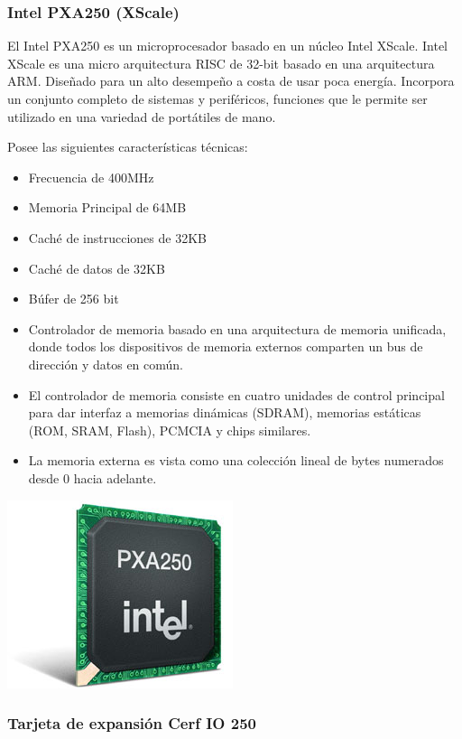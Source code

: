 \subsubsection{Intel PXA250 (XScale)}

	El Intel PXA250 es un microprocesador basado en un n\'ucleo Intel XScale.
Intel XScale es una micro arquitectura RISC de 32-bit basado en una arquitectura ARM. Dise\~nado para un alto desempe\~no a costa de usar poca energ\'ia. Incorpora un conjunto completo de sistemas y perif\'ericos, funciones que le permite ser utilizado en una variedad de port\'atiles de mano.

	Posee las siguientes caracter\'isticas t\'ecnicas:

\begin{itemize}
	\item Frecuencia de 400MHz
	\item Memoria Principal de 64MB
	\item Cach\'e de instrucciones de 32KB
	\item Cach\'e de datos de 32KB
	\item B\'ufer de 256 bit
	\item Controlador de memoria basado en una arquitectura de memoria unificada, donde todos los dispositivos de memoria externos comparten un bus de direcci\'on y datos en com\'un.
	\item El controlador de memoria consiste en cuatro unidades de control principal para dar interfaz a memorias din\'amicas (SDRAM), memorias est\'aticas (ROM, SRAM, Flash), PCMCIA y chips similares.
	\item La memoria externa es vista como una colecci\'on lineal de bytes numerados desde 0 hacia adelante.
\end{itemize}

\begin{center}
\includegraphics[scale=0.5]{images/pxa250}
\end{center}

\subsubsection{Tarjeta de expansi\'on Cerf IO 250}

